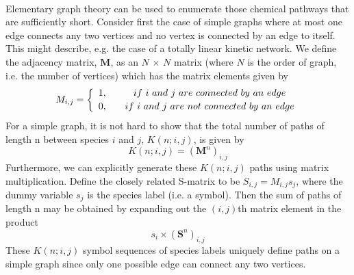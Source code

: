 \paragraph{}
Elementary graph theory can be used to enumerate those chemical pathways that
are sufficiently short. Consider first the case of simple graphs where at most one edge
connects any two vertices and no vertex is connected by an edge to itself. This might
describe, e.g. the case of a totally linear kinetic network. We define the adjacency
matrix, $\mathbf{M}$, as an $N$ $\times$ $N$ matrix (where $N$ is the order of graph, i.e. the number of vertices)
which has the matrix elements given by
\begin{eqnarray}
  M_{i,j} = \twochoices
	{1, && if ~i ~and ~j ~are ~connected ~by ~an ~edge}
	{0, && if ~i ~and ~j ~are ~not ~connected ~by ~an ~edge}
\label{ch2:eqn17}
\end{eqnarray}
For a simple graph, it is not hard to show that the total number of paths of length n
between species $i$ and $j$, $K(n; i, j)$, is given by
\begin{equation}
\label{ch2:eqn18}
K(n;i,j) = {\left( {\mathbf{M}}^n \right)}_{i,j}
\end{equation}
Furthermore, we can explicitly generate these $K(n; i, j)$ paths using matrix multiplication.
Define the closely related S-matrix to be $S_{i,j} = M_{i,j}s_j$, where the dummy variable $s_j$
is the species label (i.e. a symbol). Then the sum of paths of length n may be obtained
by expanding out the $(i,j)$th matrix element in the product
\begin{equation}
\label{ch2:eqn19}
s_i \times {\left(  {\mathbf{S}}^n \right)}_{i,j}
\end{equation}
These $K(n; i, j)$ symbol sequences of species labels uniquely define paths on a simple
graph since only one possible edge can connect any two vertices.
\newline
